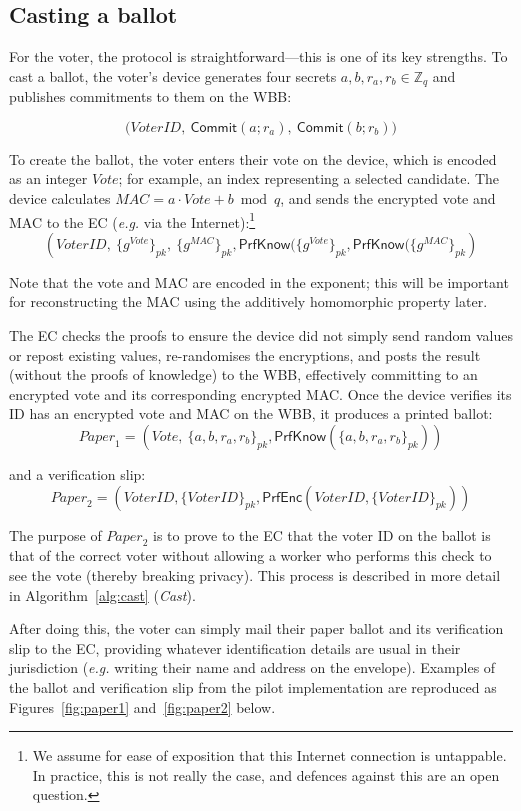 \documentclass[12pt,a4paper]{article}
\newcommand{\commit}{\mathsf{Commit}}
\newcommand{\PrfEnc}{\mathsf{PrfEnc}}
\newcommand{\PrfKnow}{\mathsf{PrfKnow}}
\theoremstyle{definition}
\newcommand{\Vote}{\mathit{Vote}}
\newcommand{\VoterID}{\mathit{VoterID}}
\newcommand{\Paper}{\mathit{Paper}}
\newcommand{\Mac}{\mathit{MAC}}
\newcommand{\eg}{\textit{e.g. }}
\begin{document}
\subsection{Casting a ballot}\label{sec:cast-ballot}
For the voter, the protocol is straightforward---this is one of its key strengths. To cast a ballot, the voter's device generates four secrets $a, b, r_a, r_b \in \mathbb{Z}_q$ and publishes commitments to them on the WBB:

$$\big(\VoterID,\ \commit(a;r_a),\ \commit(b;r_b)\big)$$

To create the ballot, the voter enters their vote on the device, which is encoded as an integer $\Vote$; for example, an index representing a selected candidate. The device calculates $\Mac=a\cdot \Vote+b \bmod q$, and sends the encrypted vote and MAC to the EC (\eg via the Internet):\footnote{We assume for ease of exposition that this Internet connection is untappable. In practice, this is not really the case, and defences against this are an open question.}
$$\left(\VoterID,\ \{g^{\Vote}\}_{pk},\ \{g^\Mac\}_{pk}, \PrfKnow(\{g^{\Vote}\}_{pk}, \PrfKnow(\{g^{\Mac}\}_{pk}\right)$$

Note that the vote and MAC are encoded in the exponent; this will be important for reconstructing the MAC using the additively homomorphic property later.

The EC checks the proofs to ensure the device did not simply send random values or repost existing values, re-randomises the encryptions, and posts the result (without the proofs of knowledge) to the WBB, effectively committing to an encrypted vote and its corresponding encrypted MAC. Once the device verifies its ID has an encrypted vote and MAC on the WBB, it produces a printed ballot:
$$\Paper_1 = \left(\Vote,\ \{a,b,r_a,r_b\}_{pk}, \PrfKnow(\{a,b,r_a,r_b\}_{pk})\right)$$

and a verification slip:
$$\Paper_2 = \left(\VoterID, \{\VoterID\}_{pk}, \PrfEnc(\VoterID, \{\VoterID\}_{pk})\right)$$

The purpose of $\Paper_2$ is to prove to the EC that the voter ID on the ballot is that of the correct voter without allowing a worker who performs this check to see the vote (thereby breaking privacy). This process is described in more detail in Algorithm~\ref{alg:cast} (\textit{Cast}).

After doing this, the voter can simply mail their paper ballot and its verification slip to the EC, providing whatever identification details are usual in their jurisdiction (\eg writing their name and address on the envelope). Examples of the ballot and verification slip from the pilot implementation are reproduced as Figures~\ref{fig:paper1} and~\ref{fig:paper2} below.
\end{document}
